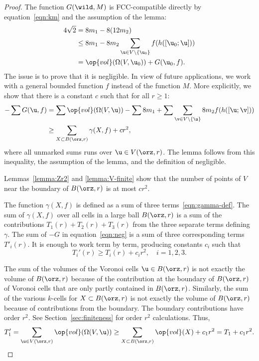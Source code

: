 \begin{proof} 
%
The function $G(\wild,M)$ is FCC-compatible directly
by equation~\eqref{eqn:km}
and the assumption of the lemma:
%
%
\begin{align*} 
4\sqrt{2} &= 8 m_1 - 8 (12 m_2)\\
&\le 8 m_1 - 8 m_2 \sum_{\u\in V\setminus \{\u_0\} } f(h([\u_0;\u]))\\
&= \op{vol}(\Omega(V, \u_0)) + G( \u_0,f).
\end{align*}
The issue is to prove that it is negligible.  In view of future applications, 
we work with a general bounded function $f$ instead
of the function $M$.   More explicitly, we show that there is a
constant $c$ such that for all $r\ge 1$:%
\begin{align}\label{eqn:neg} 
-\sum G( \u,f) &= 
\sum \op{vol}(\Omega(V, \u)) 
-\sum 8m_1 + 
\sum \sum_{\v\in V\setminus\{\u\} } 8 m_2 f(h([\u;\v]))\notag \\
&\ge \sum_{X\subset B(\orz,r)} \gamma(X,f)  + c r^2,
\end{align}
where all unmarked sums runs over $ \u\in  V(\orz,r)$.  
The lemma follows from this inequality, the assumption of the lemma,
 and the definition of negligible.

Lemmas~\ref{lemma:Zr2} and \ref{lemma:V-finite} show that the number
of points of $ V$ near the boundary of $B(\orz,r)$ is at most $c r^2$.


The function $\gamma(X,f)$ is defined as a sum of three
terms~\eqref{eqn:gamma-def}.  The sum of $\gamma(X,f)$
over all cells in a large ball
$B(\orz,r)$ is a sum of the contributions $T_1(r) + T_2(r) + T_3(r)$ from
the three separate terms defining $\gamma$.  
The sum of $-G$ in  equation~\eqref{eqn:neg} is a sum of three
corresponding terms $T'_i(r)$.  It is enough to work term by term, producing
constants $c_i$ such that
\[  
T_i'(r) \ge T_i(r) + c_i r^2,\quad i=1,2,3.
\] 

The sum of the volumes of the Voronoi cells $ \u\in B(\orz,r)$ is not
exactly the volume of $B(\orz,r)$ because of the contribution at the
boundary of $B(\orz,r)$ of Voronoi cells that are only partly contained
in $B(\orz,r)$.  Similarly, the sum of the various $k$-cells for
$X\subset B(\orz,r)$ is not exactly the volume of $B(\orz,r)$ because of
contributions from the boundary. The boundary contributions have order
$r^2$.  See Section~\ref{sec:finiteness} for order $r^2$ calculations. 
Thus,
\[  
T_1'= \sum_{ \u\in  V(\orz,r)} \op{vol}(\Omega(V, \u)) 
\ge \sum_{X\subset B(\orz,r)} \op{vol}(X) + c_1 r^2 = T_1 + c_1 r^2.
\] 



\end{proof}
